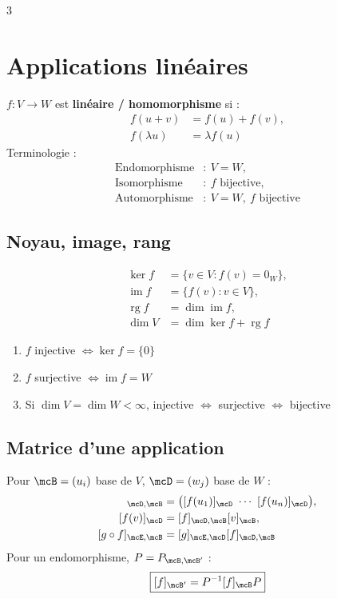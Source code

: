 \documentclass[12pt, a4paper]{article}
\newcommand{\rg}{\operatorname{rg}}
\newcommand{\im}{\operatorname{im}}
\begin{document}
\begin{multicols*}{3}
\colbreak
\section{Applications linéaires}
$f:V\to W$ est \textbf{linéaire / homomorphisme} si :
\begin{align*}
f(u+v)&=f(u)+f(v),\\
f(\lambda u)&=\lambda f(u)
\end{align*}
Terminologie :
\begin{align*}
\text{Endomorphisme}&:\ V=W,\\
\text{Isomorphisme}&:\ f\text{ bijective},\\
\text{Automorphisme}&:\ V=W,\ f\text{ bijective}
\end{align*}

\subsection{Noyau, image, rang}
\begin{align*}
\ker f&=\{v\in V:f(v)=0_W\},\\
\im f&=\{f(v):v\in V\},\\
\rg f&=\dim\im f,\\
\dim V&=\dim\ker f+\rg f
\end{align*}
\begin{enumerate}
\item $f$ injective $\iff\ker f=\{0\}$
\item $f$ surjective $\iff\im f=W$
\item Si $\dim V=\dim W<\infty$, injective $\iff$ surjective $\iff$ bijective
\end{enumerate}

\subsection{Matrice d'une application}
Pour $\mcB=(u_i)$ base de $V$, $\mcD=(w_j)$ base de $W$ :
\begin{align*}
[f]_{\mcD,\mcB}
&=\bigl([f(u_1)]_{\mcD}\ \cdots\ [f(u_n)]_{\mcD}\bigr),\\
[f(v)]_{\mcD}&=[f]_{\mcD,\mcB}[v]_{\mcB},\\
[g\circ f]_{\mcE,\mcB}&=[g]_{\mcE,\mcD}[f]_{\mcD,\mcB}
\end{align*}
Pour un endomorphisme, $P=P_{\mcB,\mcB'}$ :
\begin{align*}
\boxed{[f]_{\mcB'}=P^{-1}[f]_{\mcB}P}
\end{align*}


\end{multicols*}
\end{document}
